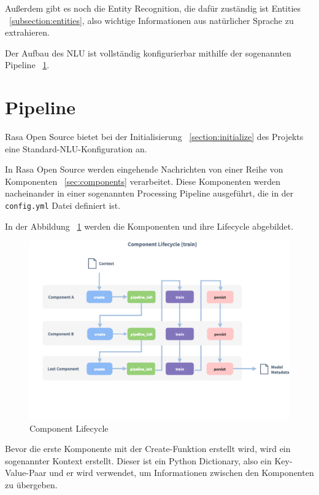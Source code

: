 Außerdem gibt es noch die Entity Recognition, die dafür zuständig ist Entities ~\ref{subsection:entities}, also wichtige Informationen aus natürlicher Sprache zu extrahieren.\cite{rasanlu}

Der Aufbau des NLU ist vollständig konfigurierbar mithilfe der sogenannten Pipeline ~\ref{sec:pipeline}.\cite{howToChooseAPipeline}

\section{Pipeline}\label{sec:pipeline}

Rasa Open Source bietet bei der Initialisierung ~\ref{section:initialize} des Projekts eine Standard-NLU-Konfiguration an.\cite{tuningYourModel}

In Rasa Open Source werden eingehende Nachrichten von einer Reihe von Komponenten ~\ref{sec:components} verarbeitet.
Diese Komponenten werden nacheinander in einer sogenannten Processing Pipeline ausgeführt, die in der \texttt{config.yml} Datei definiert ist.\cite{howToChooseAPipeline}

In der Abbildung ~\ref{fig:component_lifecycle} werden die Komponenten und ihre Lifecycle abgebildet.

\begin{figure}[hbt!]
    \centering
    \includegraphics[scale=0.4]{pics/component-lifecycle}
    \caption{Component Lifecycle~\cite{componentLifecycle}}
    \label{fig:component_lifecycle}
\end{figure}

Bevor die erste Komponente mit der Create-Funktion erstellt wird, wird ein sogenannter Kontext erstellt.
Dieser ist ein Python Dictionary, also ein Key-Value-Paar und er wird verwendet, um Informationen zwischen den Komponenten zu übergeben.\cite{componentLifecycle, componentLifecycleDoc}

